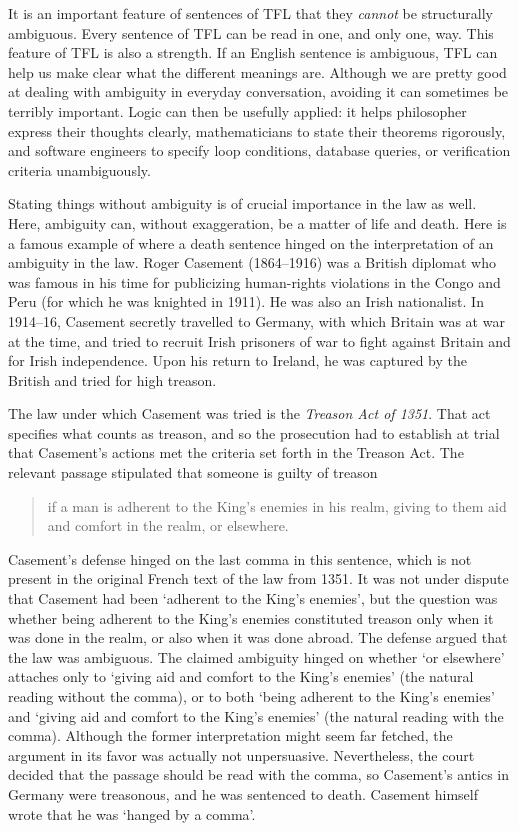 It is an important feature of sentences of TFL that they \emph{cannot} be structurally ambiguous. Every sentence of TFL can be read in one, and only one, way. This feature of TFL is also a strength. If an English sentence is ambiguous, TFL can help us make clear what the different meanings are.  Although we are pretty good at dealing with ambiguity in everyday conversation, avoiding it can sometimes be terribly important. Logic can then be usefully applied: it helps philosopher express their thoughts clearly, mathematicians to state their theorems rigorously, and software engineers to specify loop conditions, database queries, or verification criteria unambiguously. 

Stating things without ambiguity is of crucial importance in the law as well. Here, ambiguity can, without exaggeration, be a matter of life and death. Here is a famous example of where a death sentence hinged on the interpretation of an ambiguity in the law. Roger Casement (1864--1916) was a British diplomat who was famous in his time for publicizing human-rights violations in the Congo and Peru (for which he was knighted in 1911). He was also an Irish nationalist. In 1914--16, Casement secretly travelled to Germany, with which Britain was at war at the time, and tried to recruit Irish prisoners of war to fight against Britain and for Irish independence. Upon his return to Ireland, he was captured by the British and tried for high treason.

The law under which Casement was tried is the \emph{Treason Act of 1351}. That act specifies what counts as treason, and so the prosecution had to establish at trial that Casement's actions met the criteria set forth in the Treason Act. The relevant passage stipulated that someone is guilty of treason
\begin{quote}
	if a man is adherent to the King's enemies in his
realm, giving to them aid and comfort in the realm, or elsewhere.
\end{quote}
Casement's defense hinged on the last comma in this sentence, which is not present in the original French text of the law from 1351.  It was not under dispute that Casement had been `adherent to the King's enemies', but the question was whether being adherent to the King's enemies constituted treason only when it was done in the realm, or also when it was done abroad. The defense argued that the law was ambiguous. The claimed ambiguity hinged on whether `or elsewhere' attaches only to `giving aid and comfort to the King's enemies' (the natural reading without the comma), or to both `being adherent to the King's enemies' and `giving aid and comfort to the King's enemies' (the natural reading with the comma).  Although the former interpretation might seem far fetched, the argument in its favor was actually not unpersuasive. Nevertheless, the court decided that the passage should be read with the comma, so Casement's antics in Germany were treasonous, and he was sentenced to death. Casement himself wrote that he was `hanged by a comma'.

